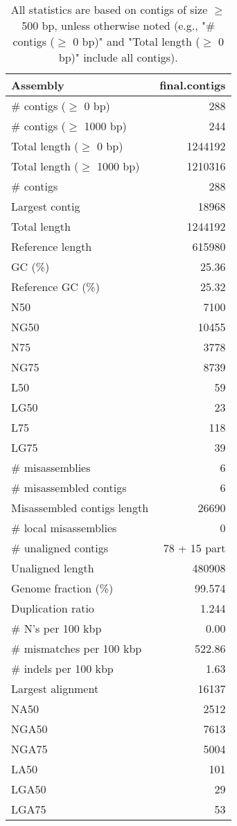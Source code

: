 \documentclass[12pt,a4paper]{article}
\begin{document}
\begin{table}[ht]
\begin{center}
\caption{All statistics are based on contigs of size $\geq$ 500 bp, unless otherwise noted (e.g., "\# contigs ($\geq$ 0 bp)" and "Total length ($\geq$ 0 bp)" include all contigs).}
\begin{tabular}{|l*{1}{|r}|}
\hline
Assembly & final.contigs \\ \hline
\# contigs ($\geq$ 0 bp) & 288 \\ \hline
\# contigs ($\geq$ 1000 bp) & 244 \\ \hline
Total length ($\geq$ 0 bp) & 1244192 \\ \hline
Total length ($\geq$ 1000 bp) & 1210316 \\ \hline
\# contigs & 288 \\ \hline
Largest contig & 18968 \\ \hline
Total length & 1244192 \\ \hline
Reference length & 615980 \\ \hline
GC (\%) & 25.36 \\ \hline
Reference GC (\%) & 25.32 \\ \hline
N50 & 7100 \\ \hline
NG50 & 10455 \\ \hline
N75 & 3778 \\ \hline
NG75 & 8739 \\ \hline
L50 & 59 \\ \hline
LG50 & 23 \\ \hline
L75 & 118 \\ \hline
LG75 & 39 \\ \hline
\# misassemblies & 6 \\ \hline
\# misassembled contigs & 6 \\ \hline
Misassembled contigs length & 26690 \\ \hline
\# local misassemblies & 0 \\ \hline
\# unaligned contigs & 78 + 15 part \\ \hline
Unaligned length & 480908 \\ \hline
Genome fraction (\%) & 99.574 \\ \hline
Duplication ratio & 1.244 \\ \hline
\# N's per 100 kbp & 0.00 \\ \hline
\# mismatches per 100 kbp & 522.86 \\ \hline
\# indels per 100 kbp & 1.63 \\ \hline
Largest alignment & 16137 \\ \hline
NA50 & 2512 \\ \hline
NGA50 & 7613 \\ \hline
NGA75 & 5004 \\ \hline
LA50 & 101 \\ \hline
LGA50 & 29 \\ \hline
LGA75 & 53 \\ \hline
\end{tabular}
\end{center}
\end{table}
\end{document}
